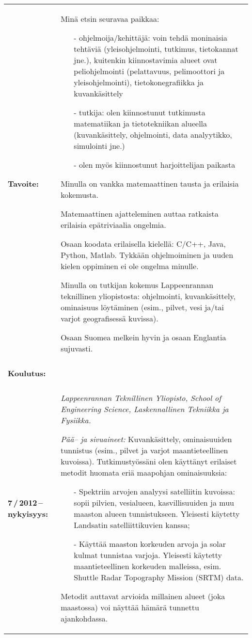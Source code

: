 \documentclass[a4paper]{article}
\begin{document}
\begin{longtable}{p{} p{}}
  \textbf{Tavoite:} &
  Min\"a etsin seuravaa paikkaa:
  \vspace{-8pt}
  \begin{itemize}
    \setlength\itemsep{-3pt}
    \item[-]ohjelmoija/kehitt\"aj\"a: voin tehd\"a moninaisia teht\"avi\"a
      (yleisohjelmointi, tutkimus, tietokannat jne.), kuitenkin kiinnostavimia
      alueet ovat peliohjelmointi (pelattavuus, pelimoottori ja
      yleisohjelmointi), tietokonegrafiikka ja kuvank\"asittely
    \item[-]tutkija: olen kiinnostunut tutkimusta matematiikan ja tietotekniikan
      alueella (kuvank\"asittely, ohjelmointi, data analyytikko, simulointi
      jne.)
    \item[-]olen my\"os kiinnostunut harjoittelijan paikasta
  \end{itemize}
  \vspace{-8pt}
Minulla on vankka matemaattinen tausta ja erilaisia kokemusta.

Matemaattinen ajatteleminen auttaa ratkaista erilaisia ep\"atriviaalia ongelmia.

Osaan koodata erilaisella kielell\"a: C/C++, Java, Python, Matlab. Tykk\"a\"an
ohjelmoiminen ja uuden kielen oppiminen ei ole ongelma minulle.

Minulla on tutkijan kokemus Lappeenrannan teknillinen yliopistosta: ohjelmointi,
kuvank\"asittely, ominaisuus l\"oyt\"aminen (esim., pilvet, vesi ja/tai varjot
geografisess\"a kuvissa).

Osaan Suomea melkein hyvin ja osaan Englantia sujuvasti.
\\
& \\
\multicolumn{2}{l}{\cellcolor{myGray}\textbf{Koulutus:}}\\
& \\

\textbf{7\,/\,2012\,--\,nykyisyys:} &
  \textmd{\textsl{Lappeenrannan Teknillinen Yliopisto, School of Engineering
  Science, Laskennallinen Tekniikka ja Fysiikka.}}

  \textit{P\"a\"a-- ja sivuaineet:} Kuvank\"asittely, ominaisuuiden tunnistus
  (esim., pilvet ja varjot maantieteellinen kuvoissa). Tutkimusty\"oss\"ani olen
  k\"aytt\"anyt erilaiset metodit huomata eri\"a maapohjan ominaisuuksia:
  \vspace{-10pt}
  \begin{itemize}
    \setlength\itemsep{-3pt}
    \item[-]Spektriin arvojen analyysi satelliitin kuvoissa: sopii pilvien,
      vesialueen, kasvillisuuiden ja muu maaston alueen tunnistukseen. Yleisesti
      k\"aytetty Landsatin satelliittikuvien kanssa;
    \item[-]K\"aytt\"a\"a maaston korkeuden arvoja ja solar kulmat tunnistaa
      varjoja.  Yleisesti k\"aytetty maantieteellinen korkeuden malleissa, esim.
      Shuttle Radar Topography Mission (SRTM) data.
  \end{itemize}
  \vspace{-10pt}
  Metodit auttavat arvioida millainen alueet (joka maastossa) voi n\"aytt\"a\"a
  h\"am\"ar\"a tunnettu ajankohdassa.


\end{longtable}
\end{document}
